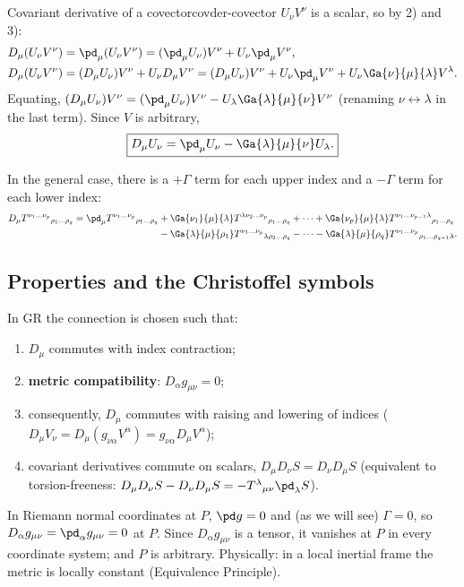 \begin{example}{Covariant derivative of a covector}{covder-covector}
$U_\nu V^\nu$ is a scalar, so by 2) and 3):
\begin{align*}
  D_\mu(U_\nu V^\nu)&=\pd_\mu(U_\nu V^\nu)=(\pd_\mu U_\nu)V^\nu+U_\nu\pd_\mu V^\nu ,\\
  D_\mu(U_\nu V^\nu)&=(D_\mu U_\nu)V^\nu+U_\nu D_\mu V^\nu=(D_\mu U_\nu)V^\nu+U_\nu\pd_\mu V^\nu+U_\nu\Ga{\nu}{\mu}{\lambda}V^\lambda .
\end{align*}
Equating, $(D_\mu U_\nu)V^\nu=(\pd_\mu U_\nu)V^\nu-U_\lambda\Ga{\lambda}{\mu}{\nu}V^\nu$ (renaming $\nu\leftrightarrow\lambda$ in the last term). Since $V$ is arbitrary,
\begin{equation}
  \boxed{D_\mu U_\nu=\pd_\mu U_\nu-\Ga{\lambda}{\mu}{\nu}U_\lambda .}
\end{equation}
\end{example}
In the general case, there is a $+\Gamma$ term for each upper index and a $-\Gamma$ term for each lower index:
\begin{align}
  D_\mu T^{\nu_1\dots\nu_p}{}_{\rho_1\dots\rho_q}=\pd_\mu T^{\nu_1\dots\nu_p}{}_{\rho_1\dots\rho_q}
  &+\Ga{\nu_1}{\mu}{\lambda}T^{\lambda\nu_2\dots\nu_p}{}_{\rho_1\dots\rho_q}+\dots+\Ga{\nu_p}{\mu}{\lambda}T^{\nu_1\dots\nu_{p-1}\lambda}{}_{\rho_1\dots\rho_q}\nonumber\\
  &-\Ga{\lambda}{\mu}{\rho_1}T^{\nu_1\dots\nu_p}{}_{\lambda\rho_2\dots\rho_q}-\dots-\Ga{\lambda}{\mu}{\rho_q}T^{\nu_1\dots\nu_p}{}_{\rho_1\dots\rho_{q-1}\lambda}.
\end{align}

\subsection{Properties and the Christoffel symbols}

In GR the connection is chosen such that:
\begin{enumerate}[nosep]
\item $D_\mu$ commutes with index contraction;
\item \textbf{metric compatibility}: $\boxed{D_\alpha g_{\mu\nu}=0}$;
\item consequently, $D_\mu$ commutes with raising and lowering of indices ($D_\mu V_\nu=D_\mu(g_{\nu\alpha}V^\alpha)=g_{\nu\alpha}D_\mu V^\alpha$);
\item covariant derivatives commute on scalars, $D_\mu D_\nu S=D_\nu D_\mu S$ (equivalent to torsion-freeness: $D_\mu D_\nu S-D_\nu D_\mu S=-T^\lambda{}_{\mu\nu}\pd_\lambda S$).
\end{enumerate}
\begin{remarkbox}[Why $D_\alpha g_{\mu\nu}=0$?]
In Riemann normal coordinates at $P$, $\pd g=0$ and (as we will see) $\Gamma=0$, so $D_\alpha g_{\mu\nu}=\pd_\alpha g_{\mu\nu}=0$ at $P$. Since $D_\alpha g_{\mu\nu}$ is a tensor, it vanishes at $P$ in every coordinate system; and $P$ is arbitrary. Physically: in a local inertial frame the metric is locally constant (Equivalence Principle).
\end{remarkbox}

